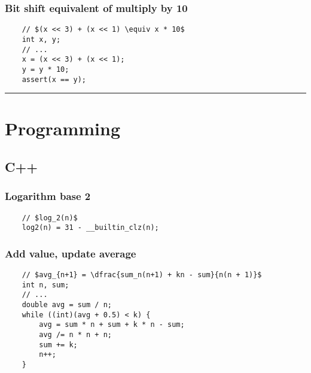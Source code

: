 \documentclass{article}
\begin{document}
\subsubsection{Bit shift equivalent of multiply by 10}
\begin{verbatim}
    // $(x << 3) + (x << 1) \equiv x * 10$
    int x, y;
    // ...
    x = (x << 3) + (x << 1);
    y = y * 10;
    assert(x == y);
\end{verbatim}

\noindent\rule{\textwidth}{1pt}

\section{Programming}
\subsection{C++}
\subsubsection{Logarithm base 2}

\begin{verbatim}
    // $log_2(n)$
    log2(n) = 31 - __builtin_clz(n);
\end{verbatim}


\subsubsection{Add value, update average}
\begin{verbatim}
    // $avg_{n+1} = \dfrac{sum_n(n+1) + kn - sum}{n(n + 1)}$
    int n, sum;
    // ...
    double avg = sum / n;
    while ((int)(avg + 0.5) < k) {
        avg = sum * n + sum + k * n - sum;
        avg /= n * n + n;
        sum += k;
        n++;
    }
\end{verbatim}
\end{document}

